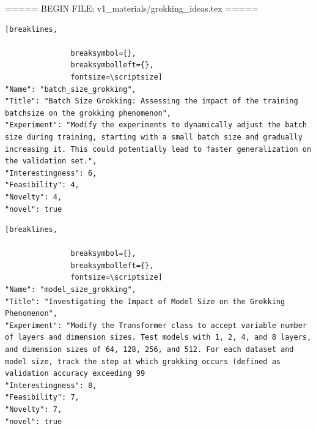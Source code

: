 ===== BEGIN FILE: v1_materials/grokking_ideas.tex =====
\begin{tcolorbox}[
  breakable,
  colback  = blue!5!white,
  colframe = blue!75!black,
  title    = {Seed Idea - \texttt{batch\_size\_grokking}},
  fontupper=\scriptsize\ttfamily,
]
\begin{Verbatim}[breaklines,

               breaksymbol={},
               breaksymbolleft={},
               fontsize=\scriptsize]
"Name": "batch_size_grokking",
"Title": "Batch Size Grokking: Assessing the impact of the training batchsize on the grokking phenomenon",
"Experiment": "Modify the experiments to dynamically adjust the batch size during training, starting with a small batch size and gradually increasing it. This could potentially lead to faster generalization on the validation set.",
"Interestingness": 6,
"Feasibility": 4,
"Novelty": 4,
"novel": true
\end{Verbatim}
\end{tcolorbox}

\begin{tcolorbox}[
  breakable,
  colback  = blue!5!white,
  colframe = blue!75!black,
  title    = {Idea 1/50 - \texttt{model\_size\_grokking}},
  fontupper=\scriptsize\ttfamily,
]
\begin{Verbatim}[breaklines,

               breaksymbol={},
               breaksymbolleft={},
               fontsize=\scriptsize]
"Name": "model_size_grokking",
"Title": "Investigating the Impact of Model Size on the Grokking Phenomenon",
"Experiment": "Modify the Transformer class to accept variable number of layers and dimension sizes. Test models with 1, 2, 4, and 8 layers, and dimension sizes of 64, 128, 256, and 512. For each dataset and model size, track the step at which grokking occurs (defined as validation accuracy exceeding 99
"Interestingness": 8,
"Feasibility": 7,
"Novelty": 7,
"novel": true
\end{Verbatim}
\end{tcolorbox}


